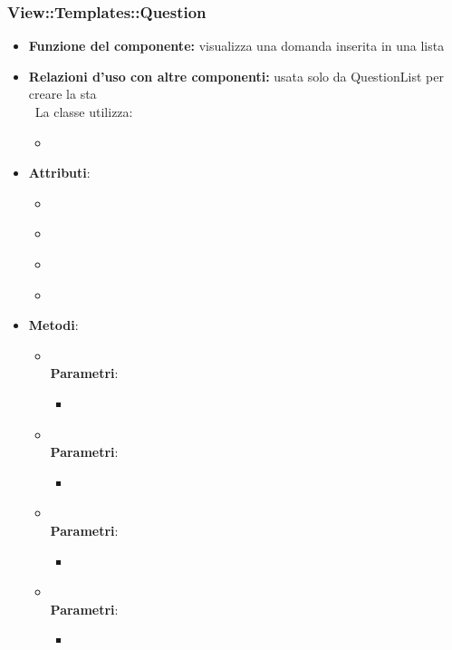 \subsubsection{View::Templates::Question}
\begin{itemize}
\item\textbf{Funzione del componente:} visualizza una domanda inserita in una lista
				\item\textbf{Relazioni d'uso con altre componenti:} usata solo da QuestionList per creare la sta\\\
La classe utilizza:
\begin{itemize}
		\item
	\end{itemize}
\item\textbf{Attributi}:
	\begin{itemize}
		\item\code{}\\
		\item\code{}\\
		\item\code{}\\
	\item\code{}\\
	\end{itemize}
\item\textbf{Metodi}:
\begin{itemize}
		\item\code{}\\
		\textbf{Parametri}:
			\begin{itemize}
			\item\code{}\\
			\end{itemize}
		\item\code{}\\
		\textbf{Parametri}:
			\begin{itemize}
				\item\code{}\\
			\end{itemize}
		\item\code{}\\
		\textbf{Parametri}:
			\begin{itemize}
				\item\code{}\\
			\end{itemize}
		\item\code{}\\
		\textbf{Parametri}:
			\begin{itemize}
				\item\code{}\\
			\end{itemize}
	\end{itemize}
\end{itemize}

